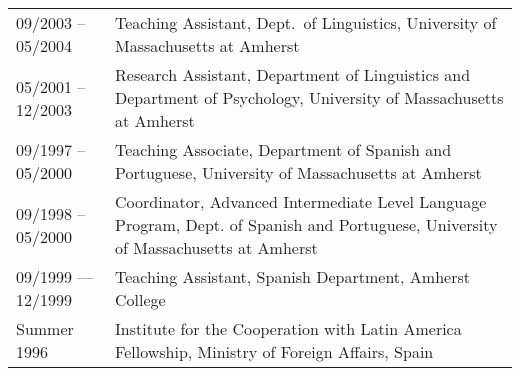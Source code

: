 \documentclass[11pt]{article}
\begin{document}
\begin{tabular}{p{2.815cm}p{280pt}}
09/2003 --  05/2004 & Teaching Assistant, Dept.\ of
Linguistics, University of Massachusetts at Amherst\\ 
05/2001 -- 12/2003& Research Assistant, Department of Linguistics and Department of Psychology,  University of Massachusetts at Amherst\\
09/1997 -- 05/2000 &  Teaching Associate, Department of Spanish and Portuguese, University of Massachusetts at Amherst\\
 09/1998 -- 05/2000 & Coordinator, Advanced Intermediate Level
 Language  Program, Dept. of Spanish and Portuguese, University of Massachusetts at Amherst\\
09/1999 ---12/1999 & Teaching Assistant, Spanish Department, Amherst
College\\
Summer 1996  & Institute for the Cooperation with Latin America
Fellowship, Ministry of Foreign Affairs, Spain\\
\end{tabular}



\end{document}
